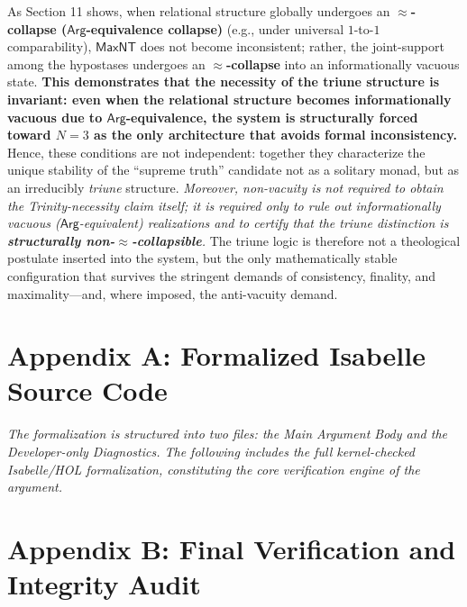 \documentclass[a4paper, 11pt]{article}
\theoremstyle{plain}
\theoremstyle{definition}
\newcommand{\Arg}{\mathsf{Arg}}           %
\begin{document}
\noindent As Section 11 shows, when relational structure globally undergoes an \textbf{$\approx$-collapse ($\Arg$-equivalence collapse)} (e.g., under universal $1$-to-$1$ comparability), $\mathsf{MaxNT}$ does not become inconsistent; rather, the joint-support among the hypostases undergoes an \textbf{$\approx$-collapse} into an informationally vacuous state. \textbf{This demonstrates that the necessity of the triune structure is invariant: even when the relational structure becomes informationally vacuous due to $\Arg$-equivalence, the system is structurally forced toward $N=3$ as the only architecture that avoids formal inconsistency.} Hence, these conditions are not independent: together they characterize the unique stability of the ``supreme truth'' candidate not as a solitary monad, but as an irreducibly \emph{triune} structure. \emph{Moreover, non-vacuity is not required to obtain the Trinity-necessity claim itself; it is required only to rule out informationally vacuous ($\Arg$-equivalent) realizations and to certify that the triune distinction is \textbf{structurally non-$\approx$-collapsible}.} The triune logic is therefore not a theological postulate inserted into the system, but the only mathematically stable configuration that survives the stringent demands of consistency, finality, and maximality---and, where imposed, the anti-vacuity demand.

\newpage
\section*{Appendix A: Formalized Isabelle Source Code}
\label{sec:source_code}
\noindent\textit{The formalization is structured into two files: the Main Argument Body and the Developer-only Diagnostics. The following includes the full kernel-checked Isabelle/HOL formalization, constituting the core verification engine of the argument.}
\begin{small}

\end{small}

\newpage
\section*{Appendix B: Final Verification and Integrity Audit}
\label{sec:final_audit}
\end{document}
